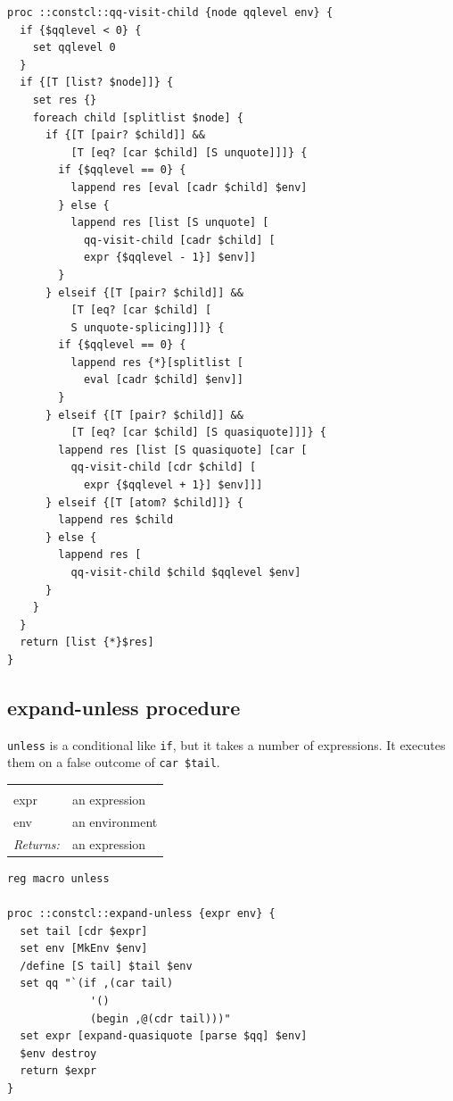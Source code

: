 \documentclass[twoside]{report}
\begin{document}
\begin{lstlisting}
proc ::constcl::qq-visit-child {node qqlevel env} {
  if {$qqlevel < 0} {
    set qqlevel 0
  }
  if {[T [list? $node]]} {
    set res {}
    foreach child [splitlist $node] {
      if {[T [pair? $child]] &&
          [T [eq? [car $child] [S unquote]]]} {
        if {$qqlevel == 0} {
          lappend res [eval [cadr $child] $env]
        } else {
          lappend res [list [S unquote] [
            qq-visit-child [cadr $child] [
            expr {$qqlevel - 1}] $env]]
        }
      } elseif {[T [pair? $child]] &&
          [T [eq? [car $child] [
          S unquote-splicing]]]} {
        if {$qqlevel == 0} {
          lappend res {*}[splitlist [
            eval [cadr $child] $env]]
        }
      } elseif {[T [pair? $child]] &&
          [T [eq? [car $child] [S quasiquote]]]} {
        lappend res [list [S quasiquote] [car [
          qq-visit-child [cdr $child] [
            expr {$qqlevel + 1}] $env]]]
      } elseif {[T [atom? $child]]} {
        lappend res $child
      } else {
        lappend res [
          qq-visit-child $child $qqlevel $env]
      }
    }
  }
  return [list {*}$res]
}
\end{lstlisting}

\subsection{expand-unless procedure}
\label{expandunless-procedure}

\texttt{unless} is a conditional like \texttt{if}, but it takes a number of expressions. It executes them on a false outcome of \texttt{car \$tail}.

\noindent\begin{tabular}{ |p{1.9cm} p{8cm}| }
\hline
\rowcolor[HTML]{CCCCCC} \multicolumn{2}{|l|}{\bf expand-unless (internal)} \\
expr & an expression \\
env & an environment \\
\textit{Returns:} & an expression \\
\hline
\end{tabular}

\begin{lstlisting}
reg macro unless

proc ::constcl::expand-unless {expr env} {
  set tail [cdr $expr]
  set env [MkEnv $env]
  /define [S tail] $tail $env
  set qq "`(if ,(car tail)
             '()
             (begin ,@(cdr tail)))"
  set expr [expand-quasiquote [parse $qq] $env]
  $env destroy
  return $expr
}
\end{lstlisting}
\end{document}
